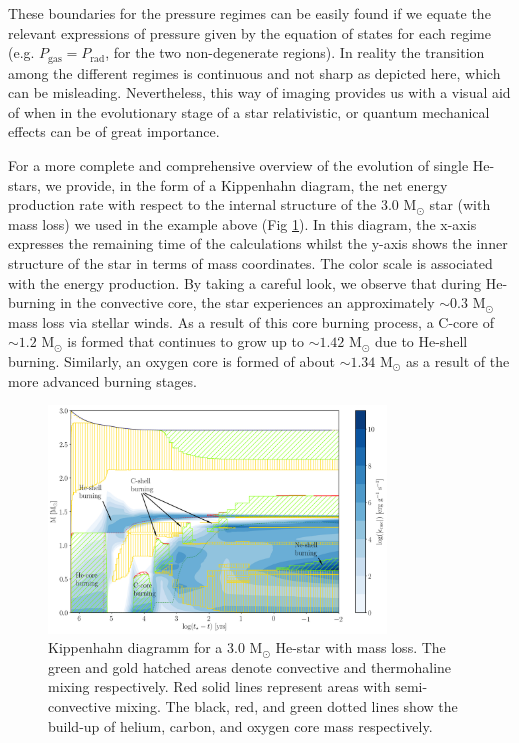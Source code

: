 \documentclass[../../main/thesis_msc.tex]{subfiles}
\begin{document}
				These boundaries for the pressure regimes can be easily found if we equate the relevant expressions of pressure given by the equation of states for each regime (e.g. $P_{\text{gas}} = P_{\text{rad}}$, for the two non-degenerate regions). In reality the transition among the different regimes is continuous and not sharp as depicted here, which can be misleading. Nevertheless, this way of imaging provides us with a visual aid of when in the evolutionary stage of a star relativistic, or quantum mechanical effects can be of great importance.
				
				For a more complete and comprehensive overview of the evolution of single He-stars, we provide, in the form of a Kippenhahn diagram, the net energy production rate with respect to the internal structure of the $3.0$ M$_{\odot}$ star (with mass loss) we used in the example above (Fig \ref{fig:Kipp_3p0_ch1}). In this diagram, the x-axis expresses the remaining time of the calculations whilst the y-axis shows the inner structure of the star in terms of mass coordinates. The color scale is associated with the energy production. By taking a careful look, we observe that during He-burning in the convective core, the star experiences an approximately $\sim 0.3$ M$_{\odot}$ mass loss via stellar winds. As a result of this core burning process, a C-core of $\sim 1.2$ M$_{\odot}$ is formed that continues to grow up to $\sim 1.42$ M$_{\odot}$ due to He-shell burning. Similarly, an oxygen core is formed of about $\sim 1.34$ M$_{\odot}$ as a result of the more advanced burning stages.
				
				\begin{figure}[t]
					\centering
					\includegraphics[width=0.8\textwidth]{../figures/chapter1/Kippenhahn_intro.png}
					\caption{Kippenhahn diagramm for a $3.0$ M$_{\odot}$ He-star with mass loss. The green and gold hatched areas denote convective and thermohaline mixing respectively. Red solid lines represent areas with semi-convective mixing. The black, red, and green dotted lines show the build-up of helium, carbon, and oxygen core mass respectively.}
					\label{fig:Kipp_3p0_ch1}
				\end{figure}
\end{document}
